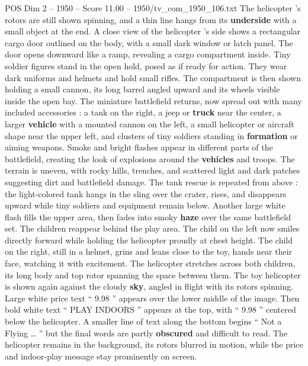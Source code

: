 \begin{textsample}{POS Dim 2 – 1950 – Score 11.00 – 1950/tv\_com\_1950\_106.txt}
The helicopter ’s rotors are still shown spinning, and a thin line hangs from its \textbf{underside} with a small object at the end.
A close view of the helicopter ’s side shows a rectangular cargo door outlined on the body, with a small dark window or latch panel.
The door opens downward like a ramp, revealing a cargo compartment inside.
Tiny soldier figures stand in the open hold, posed as if ready for action.
They wear dark uniforms and helmets and hold small rifles.
The compartment is then shown holding a small cannon, its long barrel angled upward and its wheels visible inside the open bay.
The miniature battlefield returns, now spread out with many included accessories : a tank on the right, a jeep or \textbf{truck} near the center, a larger \textbf{vehicle} with a mounted cannon on the left, a small helicopter or aircraft shape near the upper left, and clusters of tiny soldiers standing in \textbf{formation} or aiming weapons.
Smoke and bright flashes appear in different parts of the battlefield, creating the look of explosions around the \textbf{vehicles} and troops.
The terrain is uneven, with rocky hills, trenches, and scattered light and dark patches suggesting dirt and battlefield damage.
The tank rescue is repeated from above : the light-colored tank hangs in the sling over the crater, rises, and disappears upward while tiny soldiers and equipment remain below.
Another large white flash fills the upper area, then fades into smoky \textbf{haze} over the same battlefield set.
The children reappear behind the play area.
The child on the left now smiles directly forward while holding the helicopter proudly at chest height.
The child on the right, still in a helmet, grins and leans close to the toy, hands near their face, watching it with excitement.
The helicopter stretches across both children, its long body and top rotor spanning the space between them.
The toy helicopter is shown again against the cloudy \textbf{sky}, angled in flight with its rotors spinning.
Large white price text “ 9.98 ” appears over the lower middle of the image.
Then bold white text “ PLAY INDOORS ” appears at the top, with “ 9.98 ” centered below the helicopter.
A smaller line of text along the bottom begins “ Not a Flying … ” but the final words are partly \textbf{obscured} and difficult to read.
The helicopter remains in the background, its rotors blurred in motion, while the price and indoor-play message stay prominently on screen.

\end{textsample}
